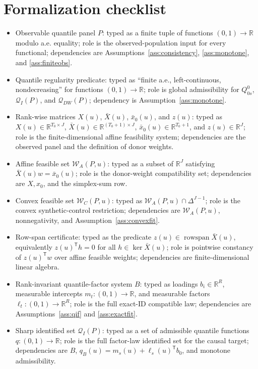 \documentclass[11pt]{article}
\newcommand{\transpose}{\mathsf{T}}
\newcommand{\R}{\mathbb{R}}
\theoremstyle{definition}
\theoremstyle{plain}
\theoremstyle{remark}
\begin{document}
\section{Formalization checklist}
\begin{itemize}[leftmargin=*]
\item Observable quantile panel \(P\): typed as a finite tuple of functions \((0,1)\to\R\) modulo a.e. equality; role is the observed-population input for every functional; dependencies are Assumptions~\ref{ass:consistency}, \ref{ass:monotone}, and \ref{ass:finiteobs}.
\item Quantile regularity predicate: typed as ``finite a.e., left-continuous, nondecreasing'' for functions \((0,1)\to\R\); role is global admissibility for \(Q^0_{0s}\), \(\mathcal{Q}_I(P)\), and \(\mathcal{Q}_{DW}(P)\); dependency is Assumption~\ref{ass:monotone}.
\item Rank-wise matrices \(X(u)\), \(\bar X(u)\), \(\bar x_0(u)\), and \(z(u)\): typed as \(X(u)\in\R^{T_0\times J}\), \(\bar X(u)\in\R^{(T_0+1)\times J}\), \(\bar x_0(u)\in\R^{T_0+1}\), and \(z(u)\in\R^J\); role is the finite-dimensional affine feasibility system; dependencies are the observed panel and the definition of donor weights.
\item Affine feasible set \(\mathcal{W}_A(P,u)\): typed as a subset of \(\R^J\) satisfying \(\bar X(u)w=\bar x_0(u)\); role is the donor-weight compatibility set; dependencies are \(X,x_0\), and the simplex-sum row.
\item Convex feasible set \(\mathcal{W}_C(P,u)\): typed as \(\mathcal{W}_A(P,u)\cap\Delta^{J-1}\); role is the convex synthetic-control restriction; dependencies are \(\mathcal{W}_A(P,u)\), nonnegativity, and Assumption~\ref{ass:convexfit}.
\item Row-span certificate: typed as the predicate \(z(u)\in\operatorname{rowspan}\bar X(u)\), equivalently \(z(u)^\transpose h=0\) for all \(h\in\ker \bar X(u)\); role is pointwise constancy of \(z(u)^\transpose w\) over affine feasible weights; dependencies are finite-dimensional linear algebra.
\item Rank-invariant quantile-factor system \(B\): typed as loadings \(b_i\in\R^R\), measurable intercepts \(m_t:(0,1)\to\R\), and measurable factors \(\ell_t:(0,1)\to\R^R\); role is the full exact-ID compatible law; dependencies are Assumptions~\ref{ass:qif} and \ref{ass:exactfit}.
\item Sharp identified set \(\mathcal{Q}_I(P)\): typed as a set of admissible quantile functions \(q:(0,1)\to\R\); role is the full factor-law identified set for the causal target; dependencies are \(B\), \(q_B(u)=m_s(u)+\ell_s(u)^\transpose b_0\), and monotone admissibility.

\end{itemize}
\end{document}
